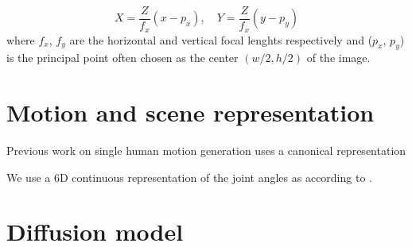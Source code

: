 \begin{equation}
    X = \frac{Z}{f_x} \left( x - p_x \right) , \quad Y = \frac{Z}{f_x} \left(y - p_y \right)
\end{equation}
where $f_x$, $f_y$ are the horizontal and vertical focal lenghts respectively and ($p_x$, $p_y$) is the principal point often chosen as the center $(w/2,h/2)$ of the image. 

\section{Motion and scene representation}
Previous work on single human motion generation uses a canonical representation 

We use a 6D continuous representation of the joint angles as according to \cite{Zhou_2019_CVPR}.


\section{Diffusion model}



